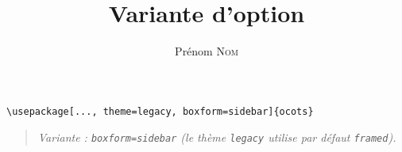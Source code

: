 \documentclass[11pt]{ocots-book}
\title{Variante d'option}
\author{Prénom \textsc{Nom}}
\newcommand{\ocotsvariantnote}[1]{\begin{quote}\itshape Variante : #1\end{quote}}
\begin{document}
\maketitle

\begin{lstlisting}
\usepackage[..., theme=legacy, boxform=sidebar]{ocots}
\end{lstlisting}
\ocotsvariantnote{\texttt{boxform=sidebar} (le th\`eme \texttt{legacy} utilise par d\'efaut \texttt{framed}).}

\end{document}
